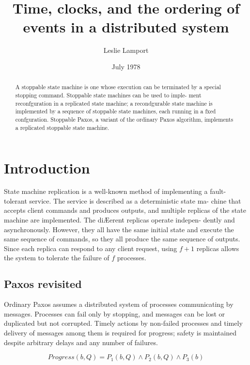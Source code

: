 \documentclass{article}
\title{Time, clocks, and the ordering of events in a distributed system}
\author{Leslie Lamport}
\date{July 1978}
\begin{document}
\maketitle

\begin{abstract}
A stoppable state machine is one whose execution can be terminated by a
special stopping command. Stoppable state machines can be used to imple-
ment reconfguration in a replicated state machine; a recondgurable state
machine is implemented by a sequence of stoppable state machines, each
running in a fxed confguration. Stoppable Paxos, a variant of the ordinary
Paxos algorithm, implements a replicated stoppable state machine.
\end{abstract}

\section{Introduction}
State machine replication is a well-known method of implementing a fault-
tolerant service. The service is described as a deterministic state ma-
chine that accepts client commands and produces outputs, and multiple replicas
of the state machine are implemented. The diÆerent replicas operate indepen-
dently and asynchronously. However, they all have the same initial state and
execute the same sequence of commands, so they all produce the same sequence
of outputs. Since each replica can respond to any client request, using $f + 1$
replicas allows the system to tolerate the failure of $f$ processes.

\subsection{Paxos revisited}
Ordinary Paxos assumes a distributed system of processes communicating by
messages.  Processes can fail only by stopping, and messages can be lost or
duplicated but not corrupted. Timely actions by non-failed processes and timely
delivery of messages among them is required for progress; safety is maintained
despite arbitrary delays and any number of failures.

\begin{equation}
	Progress(b, Q) = P_1(b, Q) \wedge P_2(b, Q) \wedge P_3(b)
\end{equation}
\end{document}
